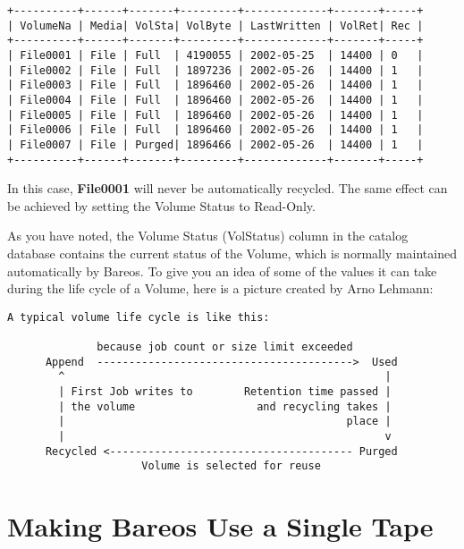 \footnotesize
\begin{verbatim}
+----------+------+-------+---------+-------------+-------+-----+
| VolumeNa | Media| VolSta| VolByte | LastWritten | VolRet| Rec |
+----------+------+-------+---------+-------------+-------+-----+
| File0001 | File | Full  | 4190055 | 2002-05-25  | 14400 | 0   |
| File0002 | File | Full  | 1897236 | 2002-05-26  | 14400 | 1   |
| File0003 | File | Full  | 1896460 | 2002-05-26  | 14400 | 1   |
| File0004 | File | Full  | 1896460 | 2002-05-26  | 14400 | 1   |
| File0005 | File | Full  | 1896460 | 2002-05-26  | 14400 | 1   |
| File0006 | File | Full  | 1896460 | 2002-05-26  | 14400 | 1   |
| File0007 | File | Purged| 1896466 | 2002-05-26  | 14400 | 1   |
+----------+------+-------+---------+-------------+-------+-----+
\end{verbatim}
\normalsize

In this case, {\bf File0001} will never be automatically recycled. The same
effect can be achieved by setting the Volume Status to Read-Only.

As you have noted, the Volume Status (VolStatus) column in the
catalog database contains the current status of the Volume, which
is normally maintained automatically by Bareos. To give you an
idea of some of the values it can take during the life cycle of
a Volume, here is a picture created by Arno Lehmann:

\footnotesize
\begin{verbatim}
A typical volume life cycle is like this:

              because job count or size limit exceeded
      Append  ---------------------------------------->  Used
        ^                                                  |
        | First Job writes to        Retention time passed |
        | the volume                   and recycling takes |
        |                                            place |
        |                                                  v
      Recycled <-------------------------------------- Purged
                     Volume is selected for reuse

\end{verbatim}
\normalsize


\section{Making Bareos Use a Single Tape}
\label{singletape}

